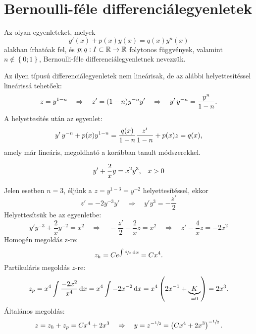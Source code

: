 \clearpage
\section{Bernoulli-féle differenciálegyenletek}

\begin{definition}
  Az olyan egyenleteket, melyek
  $$
    y'(x) + p(x)y(x) = q(x)y^n(x)
  $$
  alakban írhatóak fel, és $p; q : I \subset \mathbb{R} \rightarrow \mathbb{R}$
  folytonos függvények, valamint $n \not\in \left\{0; 1\right\}$, Bernoulli-féle
  differenciálegyenletnek nevezzük.
\end{definition}

\begin{blueBox}
  Az ilyen típusú differenciálegyenletek nem lineárisak, de az alábbi
  helyettesítéssel lineárissá tehetőek:
  $$
    z = y^{1 - n}
    \quad\Rightarrow\quad
    z' = (1 - n)y^{-n}y'
    \quad\Rightarrow\quad
    y' \, y^{-n} = \frac{y^n}{1 - n}
    \text.
  $$
  A helyettesítés után az egyenlet:
  $$
    y' \, y^{-n} + p(x)y^{1 - n} = \frac{q(x)}{1 - n}
    \frac{z'}{1 - n} + p(x)z = q(x)
    \text,
  $$
  amely már lineáris, megoldható a korábban tanult módszerekkel.
\end{blueBox}

\begin{example}
  $$
    y' + \frac{2}{x} y = x^2 y^3
    \text,\quad
    x > 0
  $$

  \boxrule

  Jelen esetben $n = 3$, éljünk a $z = y^{1 - 3} = y^{-2}$ helyettesítéssel,
  ekkor
  $$
    z' = -2y^{-3}y'
    \quad\Rightarrow\quad
    y'y^3 = -\frac{z'}{2}
  $$
  Helyettesítsük be az egyenletbe:
  $$
    y'y^{-3} + \frac{2}{x} y^{-2} = x^2
    \quad\Rightarrow\quad
    -\frac{z'}{2} + \frac{2}{x} z = x^2
    \quad\Rightarrow\quad
    z' - \frac{4}{x} z = -2x^2
  $$
  Homogén megoldás z-re:
  $$
    z_h = C e^{\int \sfrac{4}{x} \mathop{}\!\mathrm{d} x} = C x^4
    \text.
  $$
  Partikuláris megoldás $z$-re:
  $$
    z_p
    = x^4 \int \frac{-2x^2}{x^4} \mathop{}\!\mathrm{d} x
    = x^4 \int -2x^{-2} \mathop{}\!\mathrm{d} x
    = x^4 \left(2x^{-1} + \underbrace{K}_{=0}\right)
    = 2x^3
    \text.
  $$
  Általános megoldás:
  \vspace{-1em}
  $$
    z = z_h + z_p
    = C x^4 + 2x^3
    \quad\Rightarrow\quad
    y = z^{-\sfrac{1}{2}}
    = \left(C x^4 + 2x^3\right)^{-\sfrac{1}{2}}
    \text.
  $$
\end{example}